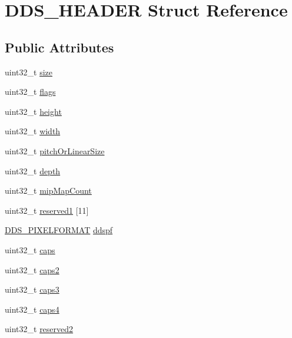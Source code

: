 \hypertarget{struct_d_d_s___h_e_a_d_e_r}{}\section{D\+D\+S\+\_\+\+H\+E\+A\+D\+ER Struct Reference}
\label{struct_d_d_s___h_e_a_d_e_r}
\subsection*{Public Attributes}
\begin{DoxyCompactItemize}
\item 
uint32\+\_\+t \mbox{\hyperlink{struct_d_d_s___h_e_a_d_e_r_a989502ea402a8e5939395a6b98ae9ce0}{size}}
\item 
uint32\+\_\+t \mbox{\hyperlink{struct_d_d_s___h_e_a_d_e_r_a418e512458f8f02ac5102993095a2aa3}{flags}}
\item 
uint32\+\_\+t \mbox{\hyperlink{struct_d_d_s___h_e_a_d_e_r_a550dc15efb086708b8eac1bfebd2e617}{height}}
\item 
uint32\+\_\+t \mbox{\hyperlink{struct_d_d_s___h_e_a_d_e_r_a2a0b8bcd7ee4d2f097c0216c8d2c2df1}{width}}
\item 
uint32\+\_\+t \mbox{\hyperlink{struct_d_d_s___h_e_a_d_e_r_a77410ea1d2209672fc6651b5322a9306}{pitch\+Or\+Linear\+Size}}
\item 
uint32\+\_\+t \mbox{\hyperlink{struct_d_d_s___h_e_a_d_e_r_aa5b6801b932296cdfdc1651310c00c9b}{depth}}
\item 
uint32\+\_\+t \mbox{\hyperlink{struct_d_d_s___h_e_a_d_e_r_a17b6d75171143338b022406db274cdb3}{mip\+Map\+Count}}
\item 
uint32\+\_\+t \mbox{\hyperlink{struct_d_d_s___h_e_a_d_e_r_a589e935e11a1d8193101741109710319}{reserved1}} \mbox{[}11\mbox{]}
\item 
\mbox{\hyperlink{struct_d_d_s___p_i_x_e_l_f_o_r_m_a_t}{D\+D\+S\+\_\+\+P\+I\+X\+E\+L\+F\+O\+R\+M\+AT}} \mbox{\hyperlink{struct_d_d_s___h_e_a_d_e_r_a27445ea81444c05a620469f266bff154}{ddspf}}
\item 
uint32\+\_\+t \mbox{\hyperlink{struct_d_d_s___h_e_a_d_e_r_abe6a0e77831687e848375587e992046a}{caps}}
\item 
uint32\+\_\+t \mbox{\hyperlink{struct_d_d_s___h_e_a_d_e_r_aaeb2d711eeae0d04523ef4786a1120fa}{caps2}}
\item 
uint32\+\_\+t \mbox{\hyperlink{struct_d_d_s___h_e_a_d_e_r_a922da2c168f35e78ba99fe7d4350b422}{caps3}}
\item 
uint32\+\_\+t \mbox{\hyperlink{struct_d_d_s___h_e_a_d_e_r_a82a00dd554e8212cb5a002b1970b225c}{caps4}}
\item 
uint32\+\_\+t \mbox{\hyperlink{struct_d_d_s___h_e_a_d_e_r_a2b94becd3bfcb64930551d3bb4387198}{reserved2}}
\end{DoxyCompactItemize}


